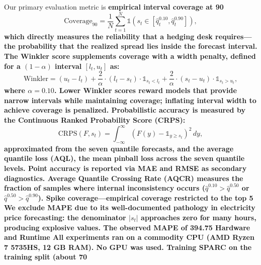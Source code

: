 Our primary evaluation metric is \textbf{empirical interval coverage at 90%
$$\text{Coverage}_{90} = \frac{1}{N}\sum_{t=1}^{N} \mathbb{1}\!\left(s_t \in [\hat{q}_t^{0.10}, \hat{q}_t^{0.90}]\right),$$
which directly measures the reliability that a hedging desk requires---the probability that the realized spread lies inside the forecast interval.
The \textbf{Winkler score} \cite{winkler1972decision} supplements coverage with a width penalty, defined for a $(1-\alpha)$ interval $[l_t, u_t]$ as:
$$\text{Winkler} = (u_t - l_t) + \frac{2}{\alpha} \cdot (l_t - s_t) \cdot \mathbb{1}_{s_t < l_t} + \frac{2}{\alpha} \cdot (s_t - u_t) \cdot \mathbb{1}_{s_t > u_t},$$
where $\alpha = 0.10$. Lower Winkler scores reward models that provide narrow intervals while maintaining coverage; inflating interval width to achieve coverage is penalized.
Probabilistic accuracy is measured by the \textbf{Continuous Ranked Probability Score} (CRPS):
$$\text{CRPS}(F, s_t) = \int_{-\infty}^{\infty} (F(y) - \mathbb{1}_{y \geq s_t})^2 \, dy,$$
approximated from the seven quantile forecasts, and the \textbf{average quantile loss} (AQL), the mean pinball loss across the seven quantile levels. Point accuracy is reported via \textbf{MAE} and \textbf{RMSE} as secondary diagnostics. \textbf{Average Quantile Crossing Rate} (AQCR) measures the fraction of samples where internal inconsistency occurs ($\hat{q}^{0.10} > \hat{q}^{0.50}$ or $\hat{q}^{0.50} > \hat{q}^{0.90}$). \textbf{Spike coverage}---empirical coverage restricted to the top 5%
We exclude MAPE due to its well-documented pathology in electricity price forecasting: the denominator $|s_t|$ approaches zero for many hours, producing explosive values. The observed MAPE of 394.75%
\textbf{Hardware and Runtime}
All experiments ran on a commodity CPU (AMD Ryzen 7 5735HS, 12 GB RAM). No GPU was used. Training SPARC on the training split (about 70%
}
